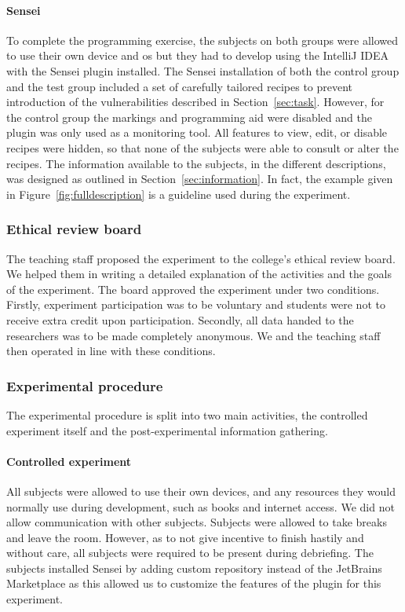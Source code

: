 \paragraph{Sensei}
To complete the programming exercise, the subjects on both groups were allowed to use their own device and \gls{os} but they had to develop using the IntelliJ IDEA with the Sensei plugin installed.
The Sensei installation of both the control group and the test group included a set of carefully tailored recipes to prevent introduction of the vulnerabilities described in Section~\ref{sec:task}.
However, for the control group the markings and programming aid were disabled and the plugin was only used as a monitoring tool.
All features to view, edit, or disable recipes were hidden, so that none of the subjects were able to consult or alter the recipes.
The information available to the subjects, in the different descriptions, was designed as outlined in Section~\ref{sec:information}.
In fact, the example given in Figure~\ref{fig:fulldescription} is a guideline used during the experiment.

\subsubsection{Ethical review board}
The teaching staff proposed the experiment to the college's ethical review board.
We helped them in writing a detailed explanation of the activities and the goals of the experiment.
The board approved the experiment under two conditions.
Firstly, experiment participation was to be voluntary and students were not to receive extra credit upon participation.
Secondly, all data handed to the researchers was to be made completely anonymous.
We and the teaching staff then operated in line with these conditions.

\subsubsection{Experimental procedure}
The experimental procedure is split into two main activities, the controlled experiment itself and the post-experimental information gathering.

\paragraph{Controlled experiment}
All subjects were allowed to use their own devices, and any resources they would normally use during development, such as books and internet access.
We did not allow communication with other subjects.
Subjects were allowed to take breaks and leave the room.
However, as to not give incentive to finish hastily and without care, all subjects were required to be present during debriefing.
The subjects installed Sensei by adding custom repository instead of the JetBrains Marketplace as this allowed us to customize the features of the plugin for this experiment.

